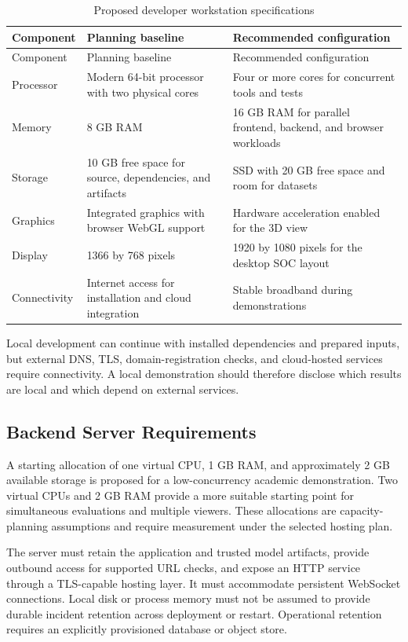\documentclass[12pt,a4paper,oneside]{report}
\begin{document}
\begin{longtable}{L{0.20\textwidth}L{0.33\textwidth}L{0.35\textwidth}}
\caption{Proposed developer workstation specifications}\label{tab:developer}\\
\toprule Component & Planning baseline & Recommended configuration \\\midrule
\endfirsthead
\toprule Component & Planning baseline & Recommended configuration \\\midrule
\endhead
Processor & Modern 64-bit processor with two physical cores & Four or more cores for concurrent tools and tests \\
Memory & 8 GB RAM & 16 GB RAM for parallel frontend, backend, and browser workloads \\
Storage & 10 GB free space for source, dependencies, and artifacts & SSD with 20 GB free space and room for datasets \\
Graphics & Integrated graphics with browser WebGL support & Hardware acceleration enabled for the 3D view \\
Display & 1366 by 768 pixels & 1920 by 1080 pixels for the desktop SOC layout \\
Connectivity & Internet access for installation and cloud integration & Stable broadband during demonstrations \\\bottomrule
\end{longtable}

Local development can continue with installed dependencies and prepared inputs, but external DNS, TLS, domain-registration checks, and cloud-hosted services require connectivity. A local demonstration should therefore disclose which results are local and which depend on external services.

\subsection{Backend Server Requirements}

A starting allocation of one virtual CPU, 1 GB RAM, and approximately 2 GB available storage is proposed for a low-concurrency academic demonstration. Two virtual CPUs and 2 GB RAM provide a more suitable starting point for simultaneous evaluations and multiple viewers. These allocations are capacity-planning assumptions and require measurement under the selected hosting plan.

The server must retain the application and trusted model artifacts, provide outbound access for supported URL checks, and expose an HTTP service through a TLS-capable hosting layer. It must accommodate persistent WebSocket connections. Local disk or process memory must not be assumed to provide durable incident retention across deployment or restart. Operational retention requires an explicitly provisioned database or object store.
\end{document}
